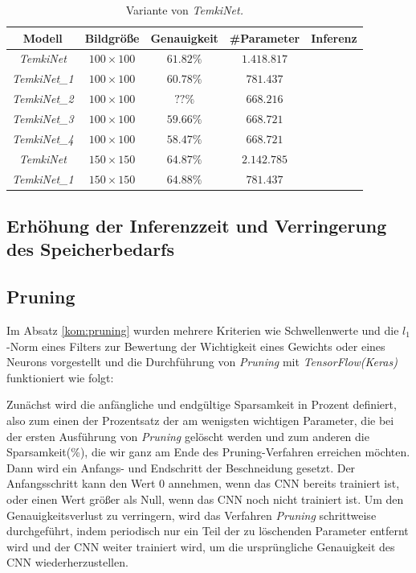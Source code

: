 \documentclass[12pt,a4paper]{scrartcl}
\numberwithin{equation}{section}
\begin{document}
\begin{table}[h!]
	\centering
	\begin{tabular}{*{5}{|c}| }
		\hline
		Modell & Bildgröße & Genauigkeit & \#Parameter& Inferenz \\ \hline
		\textit{TemkiNet}&$ 100\times100 $&$ 61.82\% $ &$ 1.418.817 $& \\ \hline
		\textit{TemkiNet\_1}&$ 100\times100 $&$ 60.78\% $ &$781.437 $ & \\ \hline
		\textit{TemkiNet\_2}&$ 100\times100 $&$ ??\% $ &$668.216$  &\\ \hline
		\textit{TemkiNet\_3}&$ 100\times100 $&$ 59.66\% $ &$ 668.721$  &\\ \hline
		\textit{TemkiNet\_4}&$ 100\times100 $&$ 58.47\% $ &$ 668.721$  &\\ \hline
		
		\textit{TemkiNet}&$ 150\times150 $&$ 64.87\% $ &$ 2.142.785 $  &\\ \hline
		\textit{TemkiNet\_1}&$ 150\times150 $&$ 64.88\% $ &$ 781.437$ & \\ \hline
	\end{tabular}
	\caption{Variante von \textit{TemkiNet.}}
	\label{tab:Bildqualitaetf}
\end{table}

\subsection{Erhöhung der Inferenzzeit und Verringerung  des Speicherbedarfs }
\subsection{Pruning}\label{exp:pruning}
Im Absatz \ref{kom:pruning} wurden mehrere Kriterien wie Schwellenwerte und die $ l_1 $-Norm eines Filters zur Bewertung der Wichtigkeit eines Gewichts oder eines Neurons  vorgestellt und die Durchführung von \textit{Pruning} mit \textit{TensorFlow(Keras)} funktioniert wie folgt:

Zunächst wird die anfängliche und endgültige Sparsamkeit in Prozent definiert, also zum einen der Prozentsatz der am wenigsten wichtigen Parameter, die bei der ersten Ausführung von \textit{Pruning} gelöscht werden und zum anderen die Sparsamkeit(\%), die wir ganz am Ende des Pruning-Verfahren erreichen möchten. Dann wird ein Anfangs- und Endschritt der Beschneidung gesetzt. Der Anfangsschritt kann den Wert $ 0 $ annehmen, wenn das \ac{CNN} bereits trainiert ist, oder einen Wert größer als Null, wenn das \ac{CNN} noch nicht trainiert ist. Um den Genauigkeitsverlust zu verringern, wird das Verfahren \textit{Pruning} schrittweise durchgeführt, indem periodisch nur ein Teil der zu löschenden Parameter entfernt wird und der CNN weiter trainiert wird, um die ursprüngliche Genauigkeit des CNN wiederherzustellen. 
\end{document}
